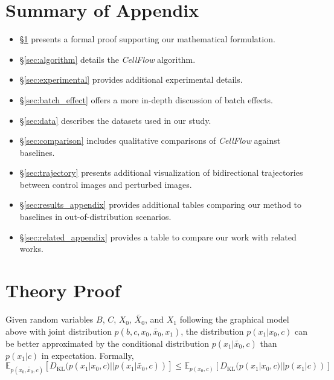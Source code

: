 \section*{Summary of Appendix}

\begin{itemize}
\item \S\ref{sec:theory} presents a formal proof supporting our mathematical formulation.
\item \S\ref{sec:algorithm} details the \emph{CellFlow} algorithm.
\item \S\ref{sec:experimental} provides additional experimental details.
\item \S\ref{sec:batch_effect} offers a more in-depth discussion of batch effects.
\item \S\ref{sec:data} describes the datasets used in our study.
\item \S\ref{sec:comparison} includes qualitative comparisons of \emph{CellFlow} against baselines.
\item \S\ref{sec:trajectory} presents additional visualization of bidirectional trajectories between control images and perturbed images.
\item \S\ref{sec:results_appendix} provides additional tables comparing our method to baselines in out-of-distribution scenarios.
\item \S\ref{sec:related_appendix} provides a table to compare our work with related works.
\end{itemize}


\newpage
\section{Theory Proof}
\label{sec:theory}

\begin{center}
\end{center}

\setcounter{prop}{0}
\begin{prop}
    \label{prop:cond2}
    Given random variables $B$, $C$, $X_0$, $\tilde{X_0}$, and $X_1$ following the graphical model above with joint distribution $p(b, c, x_0, \tilde{x_0}, x_1)$, the distribution $p(x_1|x_0,c)$ can be better approximated by the conditional distribution $p(x_1|\tilde{x_0},c)$ than $p(x_1|c)$ in expectation. Formally,
    $$\mathbb{E}_{p(x_0, \tilde{x_0}, c)}\left[ D_{\text{KL}}(p(x_1|x_0,c)||p(x_1|\tilde{x_0},c)) \right] \leq \mathbb{E}_{p(x_0, c)}\left[ D_{\text{KL}}(p(x_1|x_0,c)||p(x_1|c)) \right]$$
\end{prop}

